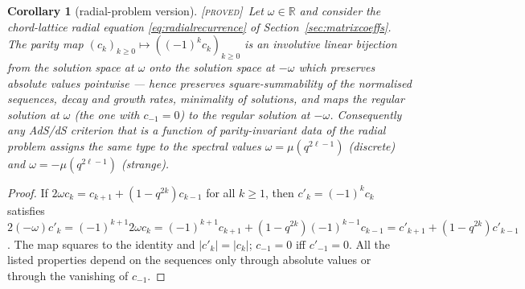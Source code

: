 \documentclass[11pt,a4paper]{article}
\newcommand{\PROVED}{{\color{ForestGreen}\textsc{[proved]}}}
\theoremstyle{definition}
\theoremstyle{plain}
\newtheorem{corollary}[definition]{Corollary}
\newcommand{\R}{\mathbb{R}}
\begin{document}
\begin{corollary}[radial-problem version]\label{cor:radialparity}
\PROVED\ Let $\omega\in\R$ and consider the chord-lattice radial equation
\eqref{eq:radialrecurrence} of Section~\ref{sec:matrixcoeffs}. The parity map
$(c_{k})_{k\ge0}\mapsto((-1)^{k}c_{k})_{k\ge0}$ is an involutive linear bijection from the
solution space at $\omega$ onto the solution space at $-\omega$ which preserves absolute
values pointwise --- hence preserves square-summability of the normalised sequences, decay
and growth rates, minimality of solutions, and maps the regular solution at $\omega$ (the one
with $c_{-1}=0$) to the regular solution at $-\omega$. Consequently any AdS/dS criterion
that is a function of parity-invariant data of the radial problem assigns the same type to
the spectral values $\omega=\mu(q^{2\ell-1})$ (discrete) and $\omega=-\mu(q^{2\ell-1})$
(strange).
\end{corollary}

\begin{proof}
If $2\omega c_{k}=c_{k+1}+(1-q^{2k})c_{k-1}$ for all $k\ge1$, then $c'_{k}=(-1)^{k}c_{k}$
satisfies $2(-\omega)c'_{k}=(-1)^{k+1}2\omega c_{k}
=(-1)^{k+1}c_{k+1}+(1-q^{2k})(-1)^{k-1}c_{k-1}=c'_{k+1}+(1-q^{2k})c'_{k-1}$. The map squares
to the identity and $|c'_{k}|=|c_{k}|$; $c_{-1}=0$ iff $c'_{-1}=0$. All the listed
properties depend on the sequences only through absolute values or through the vanishing of
$c_{-1}$.
\end{proof}
\end{document}
